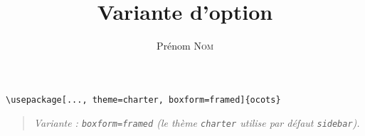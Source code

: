 \documentclass[11pt]{ocots-book}
\title{Variante d'option}
\author{Prénom \textsc{Nom}}
\newcommand{\ocotsvariantnote}[1]{\begin{quote}\itshape Variante : #1\end{quote}}
\begin{document}
\maketitle

\begin{lstlisting}
\usepackage[..., theme=charter, boxform=framed]{ocots}
\end{lstlisting}
\ocotsvariantnote{\texttt{boxform=framed} (le th\`eme \texttt{charter} utilise par d\'efaut \texttt{sidebar}).}

\end{document}
